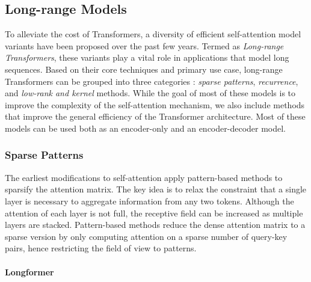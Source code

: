 \subsection{Long-range Models}

To alleviate the cost of Transformers, a diversity of efficient self-attention model variants \citep{tay2020efficient} have been proposed over the past few years. Termed as \textit{Long-range Transformers}, these variants play a vital role in applications that model long sequences. Based on their core techniques and primary use case, long-range Transformers can be grouped into three categories \citep{qin2022nlp}: \textit{sparse patterns}, \textit{recurrence}, and \textit{low-rank and kernel} methods. While the goal of most of these models is to improve the complexity of the self-attention mechanism, we also include methods that improve the general efficiency of the Transformer architecture. Most of these models can be used both as an encoder-only and an encoder-decoder model. 


\subsubsection{Sparse Patterns}

The earliest modifications to self-attention apply pattern-based methods to sparsify the attention matrix. The key idea is to relax the constraint that a single layer is necessary to aggregate information from any two tokens. Although the attention of each layer is not full, the receptive field can be increased as multiple layers are stacked. Pattern-based methods reduce the dense attention matrix to a sparse version by only computing attention on a sparse number of query-key pairs, hence restricting the field of view to patterns. 

\paragraph{Longformer}

